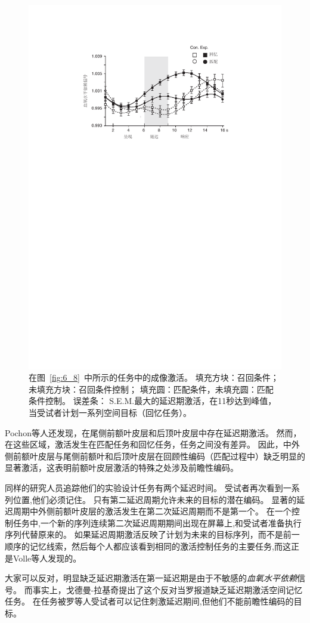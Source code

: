 \begin{figure}
	\centering
	\includegraphics[width=0.62\linewidth]{chap6/6_9}
	\caption{在图~\ref{fig:6_8}~中所示的任务中的成像激活。
		填充方块：召回条件；未填充方块：召回条件控制；
		填充圆：匹配条件，未填充圆：匹配条件控制。
		误差条： S.E.M.最大的延迟期激活，在11秒达到峰值，当受试者计划一系列空间目标（回忆任务）\cite{pochon2001role}。}
	\label{fig:6_9}
\end{figure}


Pochon等人还发现，在尾侧前额叶皮层和后顶叶皮层中存在延迟期激活。
然而，在这些区域，激活发生在匹配任务和回忆任务，任务之间没有差异。
因此，中外侧前额叶皮层与尾侧前额叶和后顶叶皮层在回顾性编码（匹配过程中）缺乏明显的显著激活，这表明前额叶皮层激活的特殊之处涉及前瞻性编码。


同样的研究人员追踪他们的实验设计任务有两个延迟时间\cite{volle2005specific}。
受试者再次看到一系列位置,他们必须记住。
只有第二延迟周期允许未来的目标的潜在编码。
显著的延迟周期中外侧前额叶皮层的激活发生在第二次延迟周期而不是第一个。
在一个控制任务中,一个新的序列连续第二次延迟周期期间出现在屏幕上,和受试者准备执行序列代替原来的。
如果延迟周期激活反映了计划为未来的目标序列，而不是前一顺序的记忆线索，然后每个人都应该看到相同的激活控制任务的主要任务,而这正是Volle等人发现的。


大家可以反对，明显缺乏延迟期激活在第一延迟期是由于不敏感的\textit{血氧水平依赖}信号。
而事实上，戈德曼-拉基奇\cite{goldman2002functional}提出了这个反对当罗\cite{rowe2000prefrontal}报道缺乏延迟期激活空间记忆任务。
在任务被罗等人受试者可以记住刺激延迟期间,但他们不能前瞻性编码的目标。


